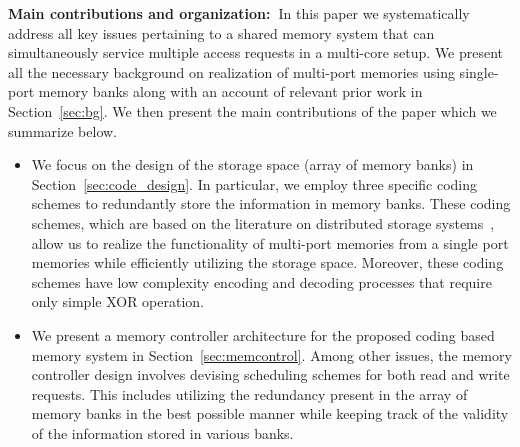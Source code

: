 \noindent \textbf{Main contributions and organization:~}In this paper we systematically address all key issues pertaining to a shared memory system that can simultaneously service multiple access requests in a multi-core setup. We present all the necessary background on realization of multi-port memories using single-port memory banks along with an account of relevant prior work in Section~\ref{sec:bg}. We then present the main contributions of the paper which we summarize below. %
\begin{itemize}
\item We focus on the design of the storage space (array of memory banks) in Section~\ref{sec:code_design}. In particular, we employ three specific coding schemes to redundantly store the information in memory banks. These coding schemes, which are based on the literature on distributed storage systems~\cite{dimakis, Gopalan12, batchcodes, RPDV16}, allow us to realize the functionality of multi-port memories from a single port memories while efficiently utilizing the storage space. Moreover, these coding schemes have low complexity encoding and decoding processes that require only simple XOR operation. %
\item We present a memory controller architecture for the proposed coding based memory system in Section~\ref{sec:memcontrol}. Among other issues, the memory controller design involves devising scheduling schemes for both read and write requests. This includes utilizing the redundancy present in the array of memory banks in the best possible manner while keeping track of the validity of the information stored in various banks.

\end{itemize}
